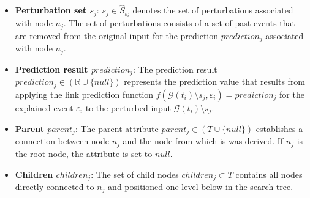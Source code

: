 \begin{itemize}
    \item \textbf{Perturbation set $s_j$}: $s_j \in \hat{S}_{\varepsilon_i}$ denotes the set of perturbations associated with node $n_j$. The set of perturbations consists of a set of past events that are removed from the original input for the prediction $prediction_j$ associated with node $n_j$.

    \item \textbf{Prediction result $prediction_j$}: The prediction result $prediction_j \in (\mathbb{R} \cup \{null\})$ represents the prediction value that results from applying the link prediction function $f(\mathcal{G}(t_i) \setminus s_j, \varepsilon_i) = prediction_j$ for the explained event $\varepsilon_i$ to the perturbed input $\mathcal{G}(t_i) \setminus s_j$.

    \item \textbf{Parent $parent_j$}: The parent attribute $parent_j \in (T \cup \{null\})$ establishes a connection between node $n_j$ and the node from which is was derived. If $n_j$ is the root node, the attribute is set to $null$.

    \item \textbf{Children $children_j$}: The set of child nodes $children_j \subset T$ contains all nodes directly connected to $n_j$ and positioned one level below in the search tree.



\end{itemize}


